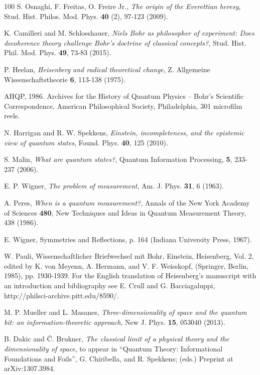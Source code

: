 \documentclass[12pt,a4]{article}
\begin{document}
\begin {thebibliography}{100}
 S. Osnaghi, F. Freitas, O. Freire Jr., {\it The origin of the Everettian heresy}, Stud. Hist. Philos. Mod. Phys. {\bf 40} (2), 97-123 (2009).

 K. Camilleri and M. Schlosshauer, {\it Niels Bohr as philosopher of experiment: Does decoherence theory challenge Bohr's doctrine of classical concepts?}, Stud. Hist. Phil. Mod. Phys. {\bf 49}, 73-83 (2015).

 P. Heelan, {\it Heisenberg and radical theoretical change}, Z. Allgemeine Wissenschaftstheorie {\bf 6}, 113-138 (1975).

 AHQP, 1986. Archives for the History of Quantum Physics -- Bohr's Scientific Correspondence, American Philosophical Society, Philadelphia, 301 microfilm reels.

 N. Harrigan and R. W. Spekkens, {\it Einstein, incompleteness, and the epistemic view of quantum states}, Found. Phys. {\bf 40}, 125 (2010).

 S. Malin, {\it What are quantum states?}, Quantum Information Processing, {\bf 5}, 233-237 (2006).

 E. P. Wigner, {\it The problem of measurement}, Am. J. Phys. {\bf 31}, 6 (1963).

 A. Peres, {\it When is a quantum measurement?}, Annals of the New York Academy of Sciences {\bf 480}, New Techniques and Ideas in Quantum Measurement Theory, 438 (1986).

 E. Wigner, Symmetries and Reflections, p. 164 (Indiana University Press, 1967).

 W. Pauli, Wissenschaftlicher Briefwechsel mit Bohr, Einstein, Heisenberg, Vol. 2, edited by K. von Meyenn, A. Hermann, and V. F. Weisskopf, (Springer, Berlin, 1985), pp. 1930-1939.
For the English translation of Heisenberg's manuscript with an introduction and bibliography see E. Crull and G. Bacciagaluppi, http://philsci-archive.pitt.edu/8590/.

 M. P. Mueller and L. Masanes, {\it 
Three-dimensionality of space and the quantum bit: an information-theoretic approach}, New J. Phys. {\bf 15}, 053040 (2013).

 B. Dakic and {\v C}. Brukner, {\it The classical limit of a physical theory and the dimensionality of space}, to appear in ``Quantum Theory: Informational Foundations and Foils'', G. Chiribella, and R. Spekkens; (eds.)  Preprint at arXiv:1307.3984.


\end{thebibliography}
\end{document}
